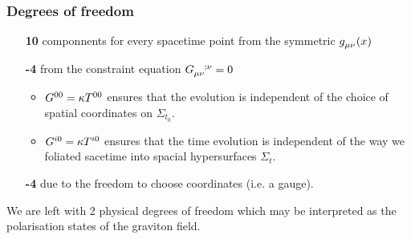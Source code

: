 \subsubsection{Degrees of freedom}
\begin{itemize}
  \item[\color{section_color}\textsf{\textbf{10}}]
  componnents for every spacetime point from the symmetric $\tensor{g}{_\mu_\nu}(x)$
  \item[\color{section_color}\textsf{\textbf{-4}}] from the
  constraint equation $\tensor{G}{_\mu_\nu^{;\nu}}=0$
  \begin{itemize}
    \item
    $\tensor{G}{^0^0}=\kappa \tensor{T}{^0^0}$ ensures that the
    evolution is independent of the choice of spatial coordinates on
    $\Sigma_{t_0}$.
    \item
    $\tensor{G}{^i^0}=\kappa \tensor{T}{^i^0}$ ensures that the time
    evolution is independent of the way we foliated sacetime into spacial
    hypersurfaces $\Sigma_{t}.    $
  \end{itemize}
  \item[\color{section_color}\textsf{\textbf{-4}}] due to the freedom
  to choose coordinates (i.e. a gauge).
\end{itemize}
We are left with 2 physical degrees of freedom which may be interpreted as the
polarisation states of the graviton field.
